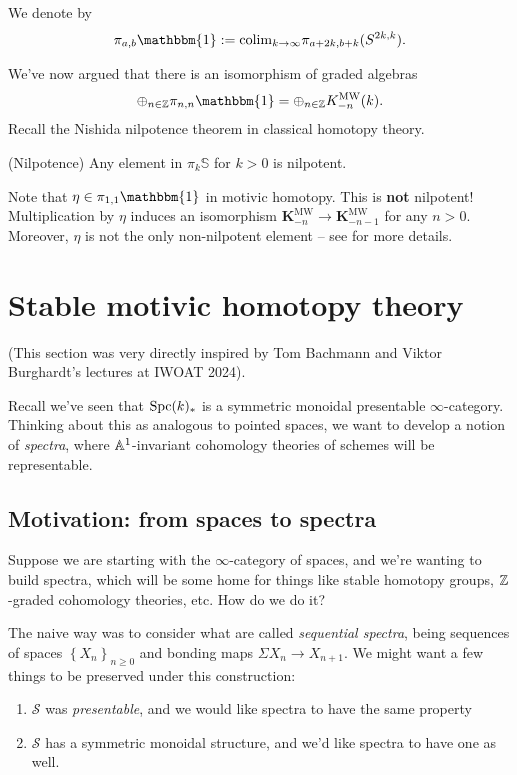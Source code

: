 \documentclass[11pt,openany]{book}
\providecommand{\MW}{\mathrm{MW}}
\providecommand{\KMW}{\mathbf{K}^\mathrm{MW}}
\begin{document}
\begin{notation} We denote by
\begin{align*}
    \pi_{a,b} \mathbbm{1} := \colim_{k\to \infty} \pi_{a + 2k, b + k} (S^{2k,k}).
\end{align*}
\end{notation}


We've now argued that there is an isomorphism of graded algebras 
\begin{align*}
    \oplus_{n\in \Z}\pi_{n,n} \mathbbm{1} = \oplus_{n\in \Z} K^\MW_{-n}(k).
\end{align*}
%
Recall the Nishida nilpotence theorem in classical homotopy theory.

\begin{theorem} (Nilpotence) Any element in $\pi_k \mathbb{S}$ for $k>0$ is nilpotent.
\end{theorem}

Note that $\eta \in \pi_{1,1} \mathbbm{1}$ in motivic homotopy. This is \textbf{not} nilpotent! Multiplication by $\eta$ induces an isomorphism $\KMW_{-n} \to \KMW_{-n-1}$ for any $n>0$. Moreover, $\eta$ is not the only non-nilpotent element -- see \cite{GuillouIsaksen} for more details.

\section{Stable motivic homotopy theory}

(This section was very directly inspired by Tom Bachmann and Viktor Burghardt's lectures at IWOAT 2024).

Recall we've seen that $\mathrm{Spc}(k)_\ast$ is a symmetric monoidal presentable $\infty$-category. Thinking about this as analogous to pointed spaces, we want to develop a notion of \textit{spectra}, where $\mathbb{A}^1$-invariant cohomology theories of schemes will be representable.

\subsection{Motivation: from spaces to spectra}

Suppose we are starting with the $\infty$-category of spaces, and we're wanting to build spectra, which will be some home for things like stable homotopy groups, $\mathbb{Z}$-graded cohomology theories, etc. How do we do it?

The naive way was to consider what are called \textit{sequential spectra}, being sequences of spaces $\left\{ X_n \right\}_{n \ge 0}$ and bonding maps $\Sigma X_n \to X_{n+1}$. We might want a few things to be preserved under this construction:
\begin{enumerate}
    \item $\mathcal{S}$ was \textit{presentable}, and we would like spectra to have the same property
    \item $\mathcal{S}$ has a symmetric monoidal structure, and we'd like spectra to have one as well.
\end{enumerate}
\end{document}
